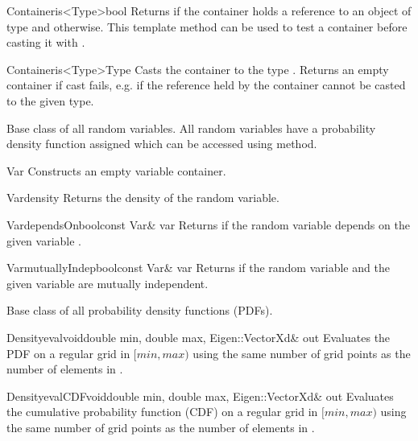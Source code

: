 \documentclass[a4paper, 10pt]{paper}
\begin{document}
\begin{defmeth}{Container}{is<Type>}{bool}{}
Returns  if the container holds a reference to an object of type  and  otherwise. 
This template method can be used to test a container before casting it with .
\end{defmeth}

\begin{defmeth}{Container}{is<Type>}{Type}{}
Casts the container to the type . Returns an empty container if cast fails, e.g. if the reference held by the 
container cannot be casted to the given type.
\end{defmeth}


Base class of all random variables. All random variables have a probability density function assigned which can be accessed
using  method.

\begin{classsyn}{Var}{} 
Constructs an empty variable container.
\end{classsyn}

\begin{defmeth}{Var}{density}{}{}
Returns the density of the random variable.
\end{defmeth}

\begin{defmeth}{Var}{dependsOn}{bool}{const Var\& var}
Returns  if the random variable depends on the given variable .
\end{defmeth}

\begin{defmeth}{Var}{mutuallyIndep}{bool}{const Var\& var}
Returns  if the random variable and the given variable are mutually independent.
\end{defmeth}


Base class of all probability density functions (PDFs).

\begin{defmeth}{Density}{eval}{void}{double min, double max, Eigen::VectorXd\& out}
Evaluates the PDF on a regular grid in $[min, max)$ using the same number of grid points as the number
of elements in .
\end{defmeth}
 
\begin{defmeth}{Density}{evalCDF}{void}{double min, double max, Eigen::VectorXd\& out}
Evaluates the cumulative probability function (CDF) on a regular grid in $[min, max)$ using the same number
of grid points as the number of elements in .
\end{defmeth}
\end{document}
